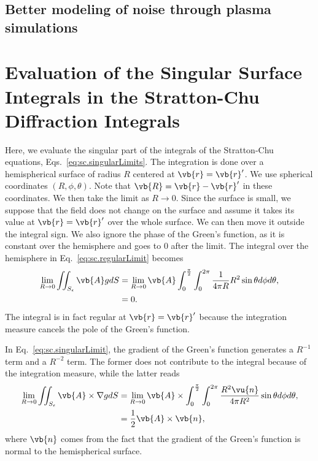\documentclass[11pt,SymmetricalJury]{inrsthesis/inrsthesis}
\begin{document}
\section{Better modeling of noise through plasma simulations}

\appendix
{}
\renewcommand{\thechapter}{\Alph{chapter}}
\renewcommand{\thesection}{\Alph{chapter}.\arabic{section}}

\chapter{Evaluation of the Singular Surface Integrals in the Stratton-Chu Diffraction Integrals}
\label{app.limits}


Here, we evaluate the singular part of the integrals of the Stratton-Chu equations,
Eqs.~\eqref{eq:sc.singularLimits}.
The integration is done over a hemispherical surface of radius $R$ centered at
$\vb{r}=\vb{r}'$. We use spherical coordinates $(R,\phi,\theta)$. Note that
$\vb{R}=\vb{r}-\vb{r}'$ in these coordinates.
We then take the limit as $R\rightarrow0$. Since the surface
is small, we suppose that the field does not change on the surface and assume
it takes its value at $\vb{r}=\vb{r}'$ over the whole surface. We can then move it
outside the integral sign. We also ignore the phase of the Green's function, as
it is constant over the hemisphere and goes to 0 after the limit.
The integral over the hemisphere in Eq.~\eqref{eq:sc.regularLimit} becomes
  \begin{align}
    \lim_{R\rightarrow0}\iint_{S_\epsilon}\vb{A}gdS
      &= \lim_{R\rightarrow0}\vb{A}\int_0^{\frac{\pi}{2}}\int_0^{2\pi}\frac{1}{4\pi R} R^2 \sin\theta d\phi d\theta,\nonumber\\
      &= 0.
  \end{align}
The integral is in fact regular at $\vb{r}=\vb{r}'$ because the integration measure
cancels the pole of the Green's function.

In Eq.~\eqref{eq:sc.singularLimit}, the gradient of the Green's function
generates a $R^{-1}$ term and a $R^{-2}$ term. The former does not contribute to the integral
because of the integration measure, while the latter reads
  \begin{align}
    \lim_{R\rightarrow0}\iint_{S_\epsilon}\vb{A}\times\nabla gdS
      &= \lim_{R\rightarrow0}\vb{A}\times
      \int_0^{\frac{\pi}{2}}\int_0^{2\pi}\frac{R^2\vu{n}}{4\pi R^2}\sin\theta d\phi d\theta, \nonumber\\
      &= \frac{1}{2}\vb{A}\times\vb{n},
  \end{align}
where $\vb{n}$ comes from the fact that the gradient of the Green's function is
normal to the hemispherical surface.
\end{document}
